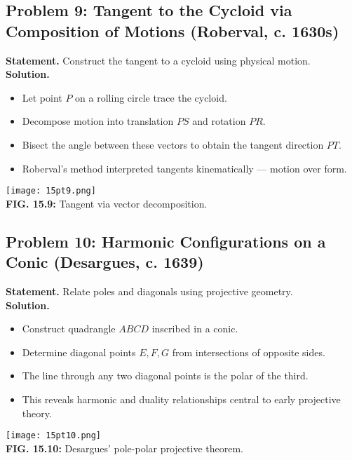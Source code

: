 \documentclass[9pt]{article}
\begin{document}
\newpage

\subsection*{Problem 9: Tangent to the Cycloid via Composition of Motions (Roberval, c. 1630s)}
\textbf{Statement.} Construct the tangent to a cycloid using physical motion. \\
\textbf{Solution.}
\begin{itemize}
  \item Let point \( P \) on a rolling circle trace the cycloid.
  \item Decompose motion into translation \( PS \) and rotation \( PR \).
  \item Bisect the angle between these vectors to obtain the tangent direction \( PT \).
  \item Roberval's method interpreted tangents kinematically — motion over form.
\end{itemize}
\begin{center}
\texttt{[image: 15pt9.png]} \\
\textbf{FIG. 15.9:} Tangent via vector decomposition.
\end{center}

\newpage

\subsection*{Problem 10: Harmonic Configurations on a Conic (Desargues, c. 1639)}
\textbf{Statement.} Relate poles and diagonals using projective geometry. \\
\textbf{Solution.}
\begin{itemize}
  \item Construct quadrangle \( ABCD \) inscribed in a conic.
  \item Determine diagonal points \( E, F, G \) from intersections of opposite sides.
  \item The line through any two diagonal points is the polar of the third.
  \item This reveals harmonic and duality relationships central to early projective theory.
\end{itemize}
\begin{center}
\texttt{[image: 15pt10.png]} \\
\textbf{FIG. 15.10:} Desargues’ pole-polar projective theorem.
\end{center}
\end{document}
